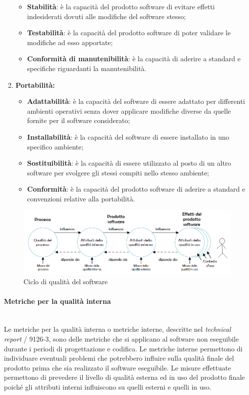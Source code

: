 \begin{enumerate}
\begin{itemize}
      \item \textbf{Stabilità}: è la capacità del prodotto software di evitare effetti indesiderati dovuti alle modifiche del software stesso;
      \item \textbf{Testabilità}: è la capacità del prodotto software di poter validare le modifiche ad esso apportate;
      \item \textbf{Conformità di manutenibilità}: è la capacità di aderire a standard e specifiche riguardanti la manutenibilità.
    \end{itemize}
    \item \textbf{Portabilità:}
    \begin{itemize}
      \item \textbf{Adattabilità}: è la capacità del software di essere adattato per differenti ambienti operativi senza dover applicare modifiche diverse da quelle fornite per il software considerato;
      \item \textbf{Installabilità}: è la capacità del software di essere installato in uno specifico ambiente;
      \item \textbf{Sostituibilità}: è la capacità di essere utilizzato al posto di un altro software per svolgere gli stessi compiti nello stesso ambiente;
      \item \textbf{Conformità}: è la capacità del prodotto software di aderire a standard e convenzioni relative alla portabilità.
    \end{itemize}
  \end{enumerate}

  \begin{figure}[h]
    \includegraphics[width=1\textwidth]{res/sections/img/qdps.png}
    \caption{Ciclo di qualità del software}
    \centering
    \label{}
  \end{figure}

  \paragraph{Metriche per la qualità interna}\\
    Le metriche per la qualità interna o metriche interne, descritte nel \emph{technical report} / 9126-3,
    sono delle metriche che si applicano al software non eseguibile durante i periodi di progettazione e codifica.
    Le metriche interne permettono di individuare eventuali problemi che potrebbero influire sulla qualità finale del prodotto prima che sia realizzato il software eseguibile.
    Le misure effettuate permettono di prevedere il livello di qualità esterna ed in uso del prodotto finale
    poiché gli attributi interni influiscono su quelli esterni e quelli in uso.\\

